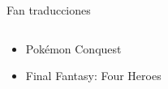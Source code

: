 \begin{frame}{Fan traducciones}
    \setlength{\leftmargini}{0em}
    \begin{columns}
    \begin{column}{0.5\textwidth}
        \begin{itemize}
            \item<1-> Pokémon Conquest
            \item<2-> Final Fantasy: Four Heroes
        \end{itemize}
        \vfill
        \hfill
    \end{column}
    \begin{column}{0.5\textwidth}

\end{column}
\end{columns}
\end{frame}

